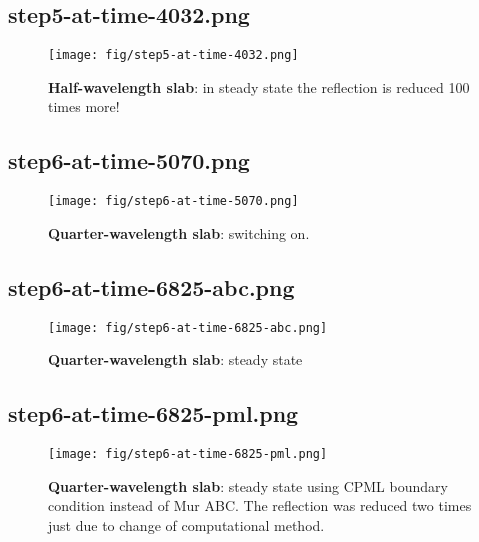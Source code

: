 \documentclass[fullscreen=true]{beamer}
\begin{document}
\subsection{step5-at-time-4032.png}
\begin{frame}
  \begin{figure}
    \texttt{[image: fig/step5-at-time-4032.png]}%
    \caption{\textbf{Half-wavelength slab}: in steady state the
      reflection is reduced 100 times more!}
  \end{figure}
\end{frame}

\subsection{step6-at-time-5070.png}
\begin{frame}
  \begin{figure}
    \texttt{[image: fig/step6-at-time-5070.png]}%
    \caption{\textbf{Quarter-wavelength slab}: switching on.}
  \end{figure}
\end{frame}

\subsection{step6-at-time-6825-abc.png}
\begin{frame}
  \begin{figure}
    \texttt{[image: fig/step6-at-time-6825-abc.png]}%
    \caption{\textbf{Quarter-wavelength slab}: steady state}
  \end{figure}
\end{frame}

\subsection{step6-at-time-6825-pml.png}
\begin{frame}
  \begin{figure}
    \texttt{[image: fig/step6-at-time-6825-pml.png]}%
    \caption{\textbf{Quarter-wavelength slab}: steady state using CPML
    boundary condition instead of Mur ABC. The reflection was reduced
    two times just due to change of computational method.}
  \end{figure}
\end{frame}
\end{document}
